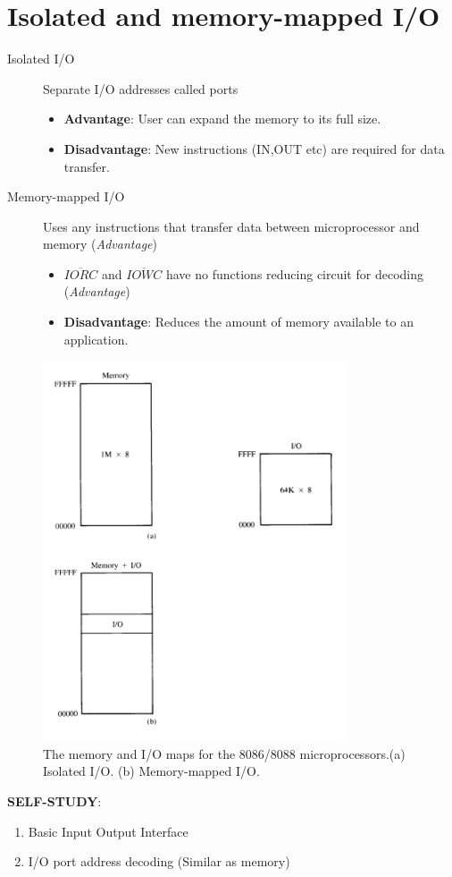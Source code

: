 \section{Isolated and memory-mapped I/O}
\begin{description}
  \item[Isolated I/O] Separate I/O addresses called ports
  \begin{itemize}
    \item \textbf{Advantage}: User can expand the memory to its full size.
    \item \textbf{Disadvantage}: New instructions (IN,OUT etc) are required for data transfer.
  \end{itemize}

  \item[Memory-mapped I/O] Uses any instructions that transfer data between microprocessor and memory (\textit{Advantage})
  \begin{itemize}
    \item $\overline{IORC}$ and $\overline{IOWC}$ have no functions reducing circuit for decoding (\textit{Advantage})
    \item \textbf{Disadvantage}: Reduces the amount of memory available to an application.
  \end{itemize}

\end{description}
\begin{figure}[h!]
  \includegraphics[width = 0.8\textwidth]{./figures/MEM_IO.png}
  \caption{The memory and I/O maps for the 8086/8088 microprocessors.(a) Isolated I/O. (b) Memory-mapped I/O.}
  \label{}
\end{figure}
\textbf{SELF-STUDY}:
\begin{enumerate}
  \item Basic Input Output Interface
  \item I/O port address decoding (Similar as memory)
\end{enumerate}

